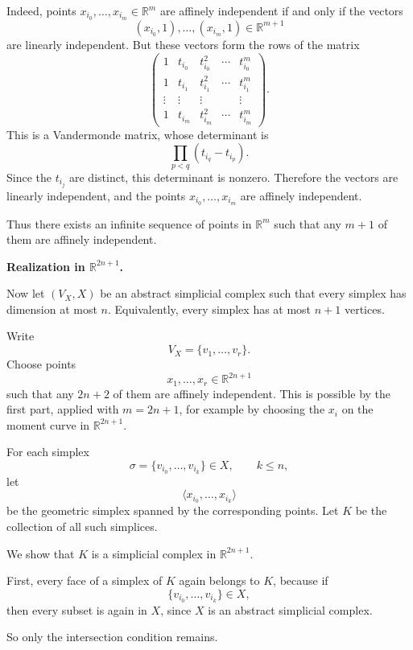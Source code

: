 \begin{solution}
Indeed, points \(x_{i_0},\dots,x_{i_m}\in \mathbb R^m\) are affinely independent if and only if the vectors
\[
(x_{i_0},1),\dots,(x_{i_m},1)\in \mathbb R^{m+1}
\]
are linearly independent. But these vectors form the rows of the matrix
\[
\begin{pmatrix}
	1 & t_{i_0} & t_{i_0}^2 & \cdots & t_{i_0}^m\\
	1 & t_{i_1} & t_{i_1}^2 & \cdots & t_{i_1}^m\\
	\vdots & \vdots & \vdots & & \vdots\\
	1 & t_{i_m} & t_{i_m}^2 & \cdots & t_{i_m}^m
\end{pmatrix}.
\]
This is a Vandermonde matrix, whose determinant is
\[
\prod_{p<q}(t_{i_q}-t_{i_p}).
\]
Since the \(t_{i_j}\) are distinct, this determinant is nonzero. Therefore the vectors are linearly independent, and the points \(x_{i_0},\dots,x_{i_m}\) are affinely independent.

Thus there exists an infinite sequence of points in \(\mathbb R^m\) such that any \(m+1\) of them are affinely independent.

\par

\textbf{Realization in \(\mathbb R^{2n+1}\).}

Now let \((V_X,X)\) be an abstract simplicial complex such that every simplex has dimension at most \(n\). Equivalently, every simplex has at most \(n+1\) vertices.

Write
\[
V_X=\{v_1,\dots,v_r\}.
\]
Choose points
\[
x_1,\dots,x_r\in \mathbb R^{2n+1}
\]
such that any \(2n+2\) of them are affinely independent. This is possible by the first part, applied with \(m=2n+1\), for example by choosing the \(x_i\) on the moment curve in \(\mathbb R^{2n+1}\).

For each simplex
\[
\sigma=\{v_{i_0},\dots,v_{i_k}\}\in X,
\qquad k\le n,
\]
let
\[
\langle x_{i_0},\dots,x_{i_k}\rangle
\]
be the geometric simplex spanned by the corresponding points. Let \(K\) be the collection of all such simplices.

We show that \(K\) is a simplicial complex in \(\mathbb R^{2n+1}\).

First, every face of a simplex of \(K\) again belongs to \(K\), because if
\[
\{v_{i_0},\dots,v_{i_k}\}\in X,
\]
then every subset is again in \(X\), since \(X\) is an abstract simplicial complex.

So only the intersection condition remains.

\par


\end{solution}
